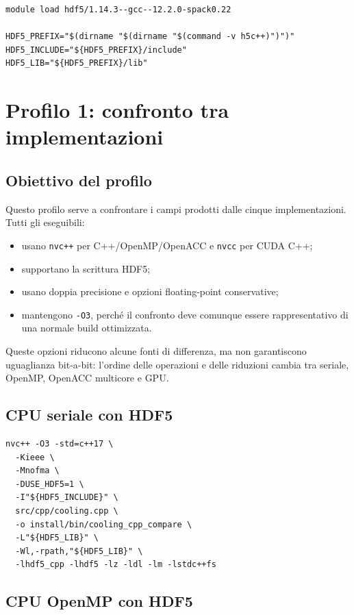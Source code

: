 \documentclass[11pt,a4paper]{article}
\begin{document}
\begin{lstlisting}[style=shell]
module load hdf5/1.14.3--gcc--12.2.0-spack0.22

HDF5_PREFIX="$(dirname "$(dirname "$(command -v h5c++)")")"
HDF5_INCLUDE="${HDF5_PREFIX}/include"
HDF5_LIB="${HDF5_PREFIX}/lib"

\end{lstlisting}


\section{Profilo 1: confronto tra implementazioni}

\subsection{Obiettivo del profilo}

Questo profilo serve a confrontare i campi prodotti dalle cinque
implementazioni. Tutti gli eseguibili:

\begin{itemize}
  \item usano \texttt{nvc++} per C++/OpenMP/OpenACC e \texttt{nvcc} per
  CUDA C++;
  \item supportano la scrittura HDF5;
  \item usano doppia precisione e opzioni floating-point conservative;
  \item mantengono \texttt{-O3}, perché il confronto deve comunque essere
  rappresentativo di una normale build ottimizzata.
\end{itemize}

Queste opzioni riducono alcune fonti di differenza, ma non garantiscono
uguaglianza bit-a-bit: l'ordine delle operazioni e delle riduzioni cambia tra
seriale, OpenMP, OpenACC multicore e GPU.

\subsection{CPU seriale con HDF5}

\begin{lstlisting}[style=shell]
nvc++ -O3 -std=c++17 \
  -Kieee \
  -Mnofma \
  -DUSE_HDF5=1 \
  -I"${HDF5_INCLUDE}" \
  src/cpp/cooling.cpp \
  -o install/bin/cooling_cpp_compare \
  -L"${HDF5_LIB}" \
  -Wl,-rpath,"${HDF5_LIB}" \
  -lhdf5_cpp -lhdf5 -lz -ldl -lm -lstdc++fs
\end{lstlisting}

\subsection{CPU OpenMP con HDF5}
\end{document}
